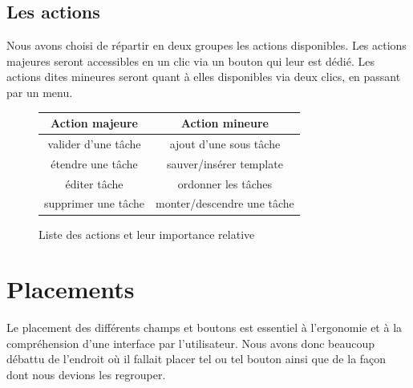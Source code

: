 \documentclass[11pt]{article}
\begin{document}
\subsection{Les actions}

Nous avons choisi de répartir en deux groupes les actions
disponibles. Les actions majeures seront accessibles en un clic via un
bouton qui leur est dédié. Les actions dites mineures seront quant à
elles disponibles via deux clics, en passant par un menu.

\begin{figure}[h]
  \centering
  
  \begin{tabular}[h!]{c|c}
    Action majeure & Action mineure\\
    \hline
    valider d'une tâche & ajout d'une sous tâche\\
    étendre une tâche & sauver/insérer template\\
    éditer tâche & ordonner les tâches\\
    supprimer une tâche & monter/descendre une tâche\\
  \end{tabular}
  
  \caption{Liste des actions et leur importance relative}
  \label{fig:actionlist}
\end{figure}





\section{Placements}

Le placement des différents champs et boutons est essentiel à
l'ergonomie et à la compréhension d'une interface par
l'utilisateur. Nous avons donc beaucoup débattu de l'endroit où il
fallait placer tel ou tel bouton ainsi que de la façon dont nous
devions les regrouper.
\end{document}

